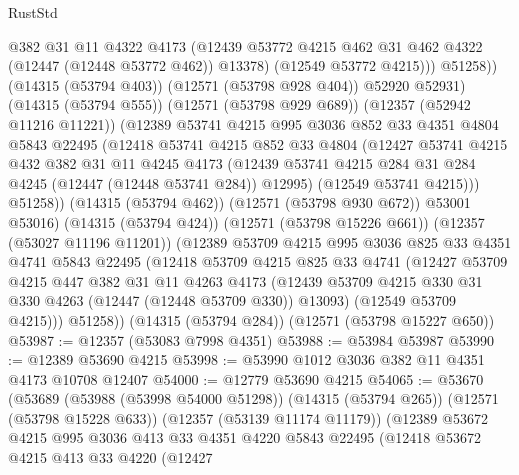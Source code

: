 \begin{lexlean}{RustStd}
\begin{coremodule}
                    @382
                    @31
                    @11
                    @4322
                    @4173
                    (@12439 @53772 @4215 @462 @31 @462 @4322 (@12447 (@12448 @53772 @462)) @13378)
                    (@12549 @53772 @4215)))
                @51258))
            (@14315 (@53794 @403))
            (@12571 (@53798 @928 @404))
            @52920
            @52931)
          (@14315 (@53794 @555))
          (@12571 (@53798 @929 @689))
          (@12357 (@52942 @11216 @11221))
          (@12389
            @53741
            @4215
            @995
            @3036
            @852
            @33
            @4351
            @4804
            @5843
            @22495
            (@12418
              @53741
              @4215
              @852
              @33
              @4804
              (@12427
                @53741
                @4215
                @432
                @382
                @31
                @11
                @4245
                @4173
                (@12439 @53741 @4215 @284 @31 @284 @4245 (@12447 (@12448 @53741 @284)) @12995)
                (@12549 @53741 @4215)))
            @51258))
        (@14315 (@53794 @462))
        (@12571 (@53798 @930 @672))
        @53001
        @53016)
      (@14315 (@53794 @424))
      (@12571 (@53798 @15226 @661))
      (@12357 (@53027 @11196 @11201))
      (@12389
        @53709
        @4215
        @995
        @3036
        @825
        @33
        @4351
        @4741
        @5843
        @22495
        (@12418
          @53709
          @4215
          @825
          @33
          @4741
          (@12427
            @53709
            @4215
            @447
            @382
            @31
            @11
            @4263
            @4173
            (@12439 @53709 @4215 @330 @31 @330 @4263 (@12447 (@12448 @53709 @330)) @13093)
            (@12549 @53709 @4215)))
        @51258))
    (@14315 (@53794 @284))
    (@12571 (@53798 @15227 @650))
@53987 := @12357 (@53083 @7998 @4351)
@53988 := @53984 @53987
@53990 := @12389 @53690 @4215
@53998 := @53990 @1012 @3036 @382 @11 @4351 @4173 @10708 @12407
@54000 := @12779 @53690 @4215
@54065 := @53670
    (@53689
      (@53988 (@53998 @54000 @51298))
      (@14315 (@53794 @265))
      (@12571 (@53798 @15228 @633))
      (@12357 (@53139 @11174 @11179))
      (@12389
        @53672
        @4215
        @995
        @3036
        @413
        @33
        @4351
        @4220
        @5843
        @22495
        (@12418
          @53672
          @4215
          @413
          @33
          @4220
          (@12427

\end{coremodule}
\end{lexlean}
